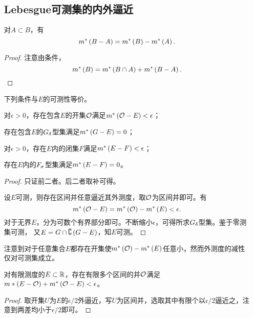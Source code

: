 \documentclass{ctexrep}
\begin{document}
  \subsection{Lebesgue可测集的内外逼近}
  \begin{lemma}
    对$A\subset B$，有
    \[ m^*\left(B-A\right) = m^*\left(B\right) - m^*\left(A\right). \]
  \end{lemma}
  \begin{proof}
  注意由\cara 条件，
  \[ m^*\left(B\right) = m^*\left(B \cap A\right) + m^*\left(B-A\right).\qedhere \]
  \end{proof}
  \begin{theorem}
    下列条件与$E$的可测性等价。
    \begin{aenum}
      \item 对$\epsilon>0$，存在包含$E$的开集$\mathcal{O}$满足$m^*\left(\mathcal{O}-E\right)<\epsilon$；
      \item 存在包含$E$的$G_\delta$型集满足$m^*\left(G-E\right)=0$；
      \item 对$\epsilon>0$，存在$E$内的闭集$F$满足$m^*\left(E-F\right)<\epsilon$；
      \item 存在$E$内的$F_\sigma$型集满足$m^*\left(E-F\right)=0$。
    \end{aenum}
  \end{theorem}
  \begin{proof}
    只证前二者。后二者取补可得。
    \par
    设$E$可测，则存在区间并任意逼近其外测度，取$\mathcal{O}$为区间并即可。有
    \[ m^*\left(\mathcal{O}-E\right) = m^*\left(\mathcal{O}\right) - m^*\left(E\right) < \epsilon. \]
    对于无界$E$，分为可数个有界部分即可。不断缩小$\epsilon$，可得所求$G_\delta$型集。鉴于零测集可测， 又$E=G\cap\complement\left(G-E\right)$，知$E$可测。
  \end{proof}
  注意到对于任意集合$E$都存在开集使$m^*\left(\mathcal{O}\right)-m^*\left(E\right)$任意小，然而外测度的减性仅对可测集成立。
  \begin{theorem}
    \label{thm:lt1}
    对有限测度的$E\subset \mathbb{R}$，存在有限多个区间的并$\mathcal{O}$满足$m*\left(E-\mathcal{O}\right) + m^*\left(\mathcal{O}-E\right) < \epsilon$。
  \end{theorem}
  \begin{proof}
    取开集$U$为$E$的$\epsilon/2$外逼近，写$U$为区间并，选取其中有限个以$\epsilon/2$逼近之，注意到两差均小于$\epsilon/2$即可。
  \end{proof}
\end{document}
